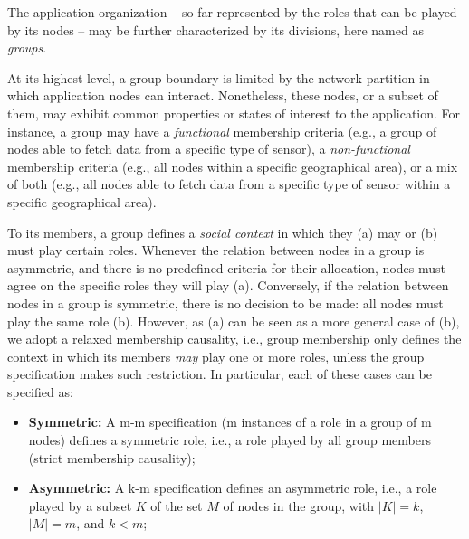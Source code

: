 
The application organization -- so far represented by the roles that can be played by its nodes -- may be further characterized by its divisions, here named as \textit{groups}. 

At its highest level, a group boundary is limited by the network partition in which application nodes can interact. Nonetheless, these nodes, or a subset of them, may exhibit common properties or states of interest to the application. For instance, a group may have a \textit{functional} membership criteria (e.g., a group of nodes able to fetch data from a specific type of sensor), a \textit{non-functional} membership criteria (e.g., all nodes within a specific geographical area), or a mix of both (e.g., all nodes able to fetch data from a specific type of sensor within a specific geographical area). %

To its members, a group defines a \textit{social context} in which they (a) may or (b) must play certain roles. Whenever the relation between nodes in a group is asymmetric, and there is no predefined criteria for their allocation, nodes must agree on the specific roles they will play (a). Conversely, if the relation between nodes in a group is symmetric, there is no decision to be made: all nodes must play the same role (b). However, as (a) can be seen as a more general case of (b), we adopt a relaxed membership causality, i.e., group membership only defines the context in which its members \textit{may} play one or more roles, unless the group specification makes such restriction. In particular, each of these cases can be specified as:

\begin{itemize}
	
	\item \textbf{Symmetric:} A m-m specification (m instances of a role in a group of m nodes) defines a symmetric role, i.e., a role played by all group members (strict membership causality);
	
	\item \textbf{Asymmetric:} A k-m specification defines an asymmetric role, i.e., a role played by a subset $K$ of the set $M$ of nodes in the group, with $|K| = k$, $|M| = m$, and $k < m$;
	
	
\end{itemize}

